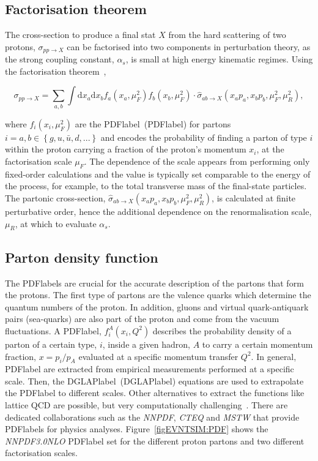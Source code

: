 \subsection{Factorisation theorem}

The cross-section to produce a final stat $X$ from the hard scattering of two protons, $\sigma_{pp\to X}$ can be factorised into two components in perturbation theory, as the strong coupling constant, $\alpha_s$, is small at high energy kinematic regimes. Using the factorisation theorem~\cite{Factorisation},

\begin{equation}
    \sigma_{pp\to X}=\sum_{a,b}\int \text{d}x_a\text{d}x_b f_a(x_a,\mu_F^2)f_b(x_b,\mu_F^2)\cdot\hat{\sigma}_{ab\to X}(x_a p_a,x_b p_b,\mu_F^2,\mu_R^2),
\end{equation}

where $f_i(x_i,\mu_F^2)$ are the \acrlong{PDFlabel}~(\acrshort{PDFlabel}) for partons $i=a,b\in\left\{g, u, \bar{u}, d, ...\right\}$ and encodes the probability of finding a parton of type $i$ within the proton carrying a fraction of the proton's momentum $x_i$, at the factorisation scale $\mu_F$. The dependence of the scale appears from performing only fixed-order calculations and the value is typically set comparable to the energy of the process, for example, to the total transverse mass of the final-state particles. The partonic cross-section, $\hat{\sigma}_{ab\to X}(x_a p_a,x_b p_b,\mu_F^2,\mu_R^2)$, is calculated at finite perturbative order, hence the additional dependence on the renormalisation scale, $\mu_R$, at which to evaluate $\alpha_s$.

\subsection{Parton density function}

The \acrshort{PDFlabel}s are crucial for the accurate description of the partons that form the protons. The first type of partons are the valence quarks which determine the quantum numbers of the proton. In addition, gluons and virtual quark-antiquark pairs (sea-quarks) are also part of the proton and come from the vacuum fluctuations. A \acrshort{PDFlabel}, $f_i^A(x_i,Q^2)$ describes the probability density of a parton of a certain type, $i$, inside a given hadron, $A$ to carry a certain momentum fraction, $x=p_i/p_A$ evaluated at a specific momentum transfer $Q^2$. In general, \acrshort{PDFlabel} are extracted from empirical measurements performed at a specific scale. Then, the \acrlong{DGLAPlabel}~(\acrshort{DGLAPlabel}) equations are used to extrapolate the \acrshort{PDFlabel} to different scales. Other alternatives to extract the functions like lattice \acrshort{QCD} are possible, but very computationally challenging~\cite{Bhat_2021}.
There are dedicated collaborations such as the \textit{NNPDF}, \textit{CTEQ} and \textit{MSTW} that provide~\cite{Ball_2015,LesHouches,Martin_2009}
 \acrshort{PDFlabel}s for physics analyses. Figure~\ref{figEVNTSIM:PDF} shows the \textit{NNPDF3.0NLO} \acrshort{PDFlabel} set for the different proton partons and two different factorisation scales.


